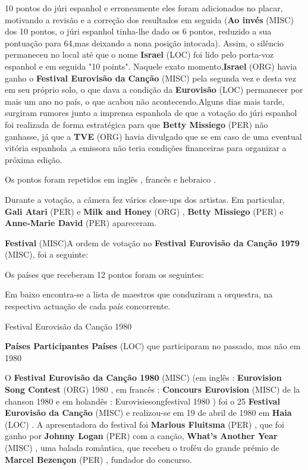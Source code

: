 \documentclass[12pt,a4paper]{article}
\begin{document}
10 pontos do júri espanhol e erroneamente eles foram adicionados no placar, motivando a revisão e a correção dos resultados em seguida (\textbf{Ao invés} (MISC) dos 10 pontos, o júri espanhol tinha-lhe dado os 6 pontos, reduzido a sua pontuação para 64,mas deixando a nona posição intocada). Assim, o silêncio permaneceu no local até que o nome \textbf{Israel} (LOC) foi lido pelo porta-voz espanhol e em seguida "10 points". Naquele exato momento,\textbf{Israel} (ORG) havia ganho o \textbf{Festival Eurovisão da Canção} (MISC) pela segunda vez e desta vez em seu próprio solo, o que dava a condição da \textbf{Eurovisão} (LOC) permanecer por mais um ano no país, o que acabou não acontecendo.Alguns dias mais tarde, surgiram rumores junto a imprensa espanhola de que a votação do júri espanhol foi realizada de forma estratégica para que \textbf{Betty Missiego} (PER) não ganhasse, já que a \textbf{TVE} (ORG) havia divulgado que se em caso de uma eventual vitória espanhola ,a emissora não teria condições financeiras para organizar a próxima edição.

Os pontos foram repetidos em inglês , francês e hebraico .

Durante a votação, a câmera fez vários close-ups dos artistas. Em particular, \textbf{Gali Atari} (PER) e \textbf{Milk and Honey} (ORG) , \textbf{Betty Missiego} (PER) e \textbf{Anne-Marie David} (PER) apareceram.



\textbf{Festival} (MISC)A ordem de votação no \textbf{Festival Eurovisão da Canção 1979} (MISC), foi a seguinte:

Os países que receberam 12 pontos foram os seguintes:

Em baixo encontra-se a lista de maestros que conduziram a orquestra, na respectiva actuação de cada país concorrente.



Festival Eurovisão da Canção 1980



\textbf{Países Participantes Países} (LOC) que participaram no passado, mas não em 1980

O \textbf{Festival Eurovisão da Canção 1980} (MISC) (em inglês : \textbf{Eurovision Song Contest} (ORG) 1980 , em francês : \textbf{Concours Eurovision} (MISC) de la chanson 1980 e em holandês : Eurovisiesongfestival 1980 ) foi o 25 \textbf{Festival Eurovisão da Canção} (MISC) e realizou-se em 19 de abril de 1980 em \textbf{Haia} (LOC) . A apresentadora do festival foi \textbf{Marlous Fluitsma} (PER) , que foi ganho por \textbf{Johnny Logan} (PER) com a canção, \textbf{What's Another Year} (MISC) , uma balada romântica, que recebeu o troféu do grande prémio de \textbf{Marcel Bezençon} (PER) , fundador do concurso.
\end{document}
